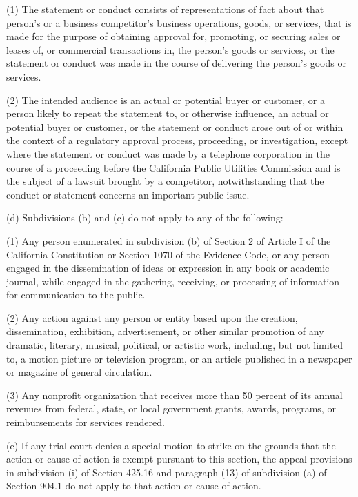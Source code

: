 \begin{quoting}
\noindent (1) The statement or conduct consists of representations of fact about that person's or a business competitor's business operations, goods, or services, that is made for the purpose of obtaining approval for, promoting, or securing sales or leases of, or commercial transactions in, the person's goods or services, or the statement or conduct was made in the course of delivering the person's goods or services.

\noindent (2) The intended audience is an actual or potential buyer or customer, or a person likely to repeat the statement to, or otherwise influence, an actual or potential buyer or customer, or the statement or conduct arose out of or within the context of a regulatory approval process, proceeding, or investigation, except where the statement or conduct was made by a telephone corporation in the course of a proceeding before the California Public Utilities Commission and is the subject of a lawsuit brought by a competitor, notwithstanding that the conduct or statement concerns an important public issue.

\noindent (d) Subdivisions (b) and (c) do not apply to any of the following:

\noindent (1) Any person enumerated in subdivision (b) of Section 2 of Article I of the California Constitution or Section 1070 of the Evidence Code, or any person engaged in the dissemination of ideas or expression in any book or academic journal, while engaged in the gathering, receiving, or processing of information for communication to the public.

\noindent (2) Any action against any person or entity based upon the creation, dissemination, exhibition, advertisement, or other similar promotion of any dramatic, literary, musical, political, or artistic work, including, but not limited to, a motion picture or television program, or an article published in a newspaper or magazine of general circulation.

\noindent (3) Any nonprofit organization that receives more than 50 percent of its annual revenues from federal, state, or local government grants, awards, programs, or reimbursements for services rendered.

\noindent (e) If any trial court denies a special motion to strike on the grounds that the action or cause of action is exempt pursuant to this section, the appeal provisions in subdivision (i) of Section 425.16 and paragraph (13) of subdivision (a) of Section 904.1 do not apply to that action or cause of action.
\end{quoting}

